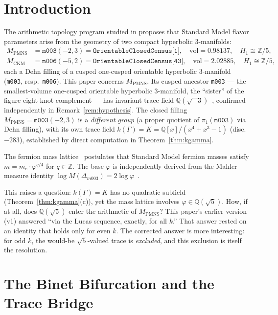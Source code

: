 \documentclass[12pt]{article}
\theoremstyle{definition}
\newcommand{\Z}{\mathbb{Z}}
\newcommand{\Q}{\mathbb{Q}}
\newcommand{\ph}{\varphi}
\newcommand{\logph}{\log\ph}
\begin{document}
\section{Introduction}

The arithmetic topology program studied in
\cite{gentry-ckm,gentry-pmns,gentry-cp,gentry-twist}
proposes that Standard Model flavor parameters arise from the geometry
of two compact hyperbolic 3-manifolds:
\begin{align*}
M_{\mathrm{PMNS}} &= \texttt{m003}(-2,3) = \texttt{OrientableClosedCensus[1]},\quad
  \mathrm{vol} = 0.98137,\quad H_1 \cong \mathbb{Z}/5,\\
M_{\mathrm{CKM}}  &= \texttt{m006}(-5,2) = \texttt{OrientableClosedCensus[43]},\quad
  \mathrm{vol} = 2.02885,\quad H_1 \cong \mathbb{Z}/5,
\end{align*}
each a Dehn filling of a cusped one-cusped orientable hyperbolic
3-manifold (\texttt{m003}, resp.\ \texttt{m006}). This paper concerns
$M_{\mathrm{PMNS}}$. Its cusped ancestor \texttt{m003} --- the
smallest-volume one-cusped orientable hyperbolic 3-manifold, the
``sister'' of the figure-eight knot complement --- has invariant trace
field $\Q(\sqrt{-3})$~\cite{maclachlan-reid}, confirmed independently
in Remark~\ref{rem:hypothesis}. The closed filling
$M_{\mathrm{PMNS}}=\texttt{m003}(-2,3)$ is a \emph{different group} (a
proper quotient of $\pi_1(\texttt{m003})$ via Dehn filling), with its
own trace field $k(\Gamma)=K=\Q[x]/(x^4+x^3-1)$ (disc.\ $-283$),
established by direct computation in Theorem~\ref{thm:kgamma}.

The fermion mass lattice~\cite{gentry-core} postulates that Standard
Model fermion masses satisfy $m = m_e \cdot \ph^{q/4}$ for $q \in \Z$.
The base $\ph$ is independently derived from the Mahler measure identity
$\log M(\Delta_{m003}) = 2\logph$~\cite{gentry-jktr}.

This raises a question: $k(\Gamma)=K$ has no quadratic subfield
(Theorem~\ref{thm:kgamma}(c)), yet the mass lattice involves
$\ph \in \Q(\sqrt{5})$. How, if at all, does
$\Q(\sqrt{5})$ enter the arithmetic of $M_{\mathrm{PMNS}}$?
This paper's earlier version (v1) answered ``via the Lucas sequence,
exactly, for all $k$.'' That answer rested on an identity that holds
only for even $k$. The corrected answer is more interesting: for odd
$k$, the would-be $\sqrt5$-valued trace is \emph{excluded}, and this
exclusion is itself the resolution.

\section{The Binet Bifurcation and the Trace Bridge}
\end{document}
